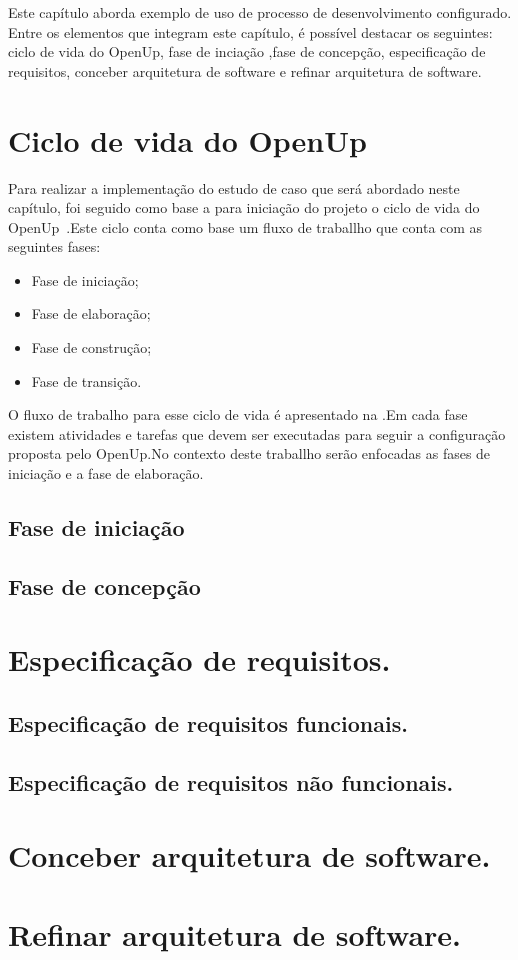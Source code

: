 Este capítulo aborda exemplo de uso de processo de desenvolvimento configurado. Entre os elementos que integram este capítulo, é possível destacar os seguintes: ciclo de vida do OpenUp, fase de inciação ,fase de concepção, especificação de requisitos, conceber arquitetura de software e refinar arquitetura de software.

\section{Ciclo de vida do OpenUp}

Para realizar a implementação do estudo de caso que será abordado neste capítulo, foi seguido como base a para iniciação do projeto o ciclo de vida do OpenUp~\cite{openup}.Este ciclo conta como base um fluxo de traballho que conta com as seguintes fases:
\begin{itemize}
    \item Fase de iniciação;
    \item Fase de elaboração;
    \item Fase de construção;
    \item Fase de transição.
\end{itemize}

%

O fluxo de trabalho para esse ciclo de vida é apresentado na .Em cada fase existem atividades e tarefas que devem ser executadas para seguir a configuração proposta pelo OpenUp.No contexto deste traballho serão enfocadas as fases de iniciação e a fase de elaboração.

\subsection{Fase de iniciação}
\subsection{Fase de concepção}
\section{Especificação de requisitos.}
\subsection{Especificação de requisitos funcionais.}
\subsection{Especificação de requisitos não funcionais.}
\section{Conceber arquitetura de software.}
\section{Refinar arquitetura de software.}